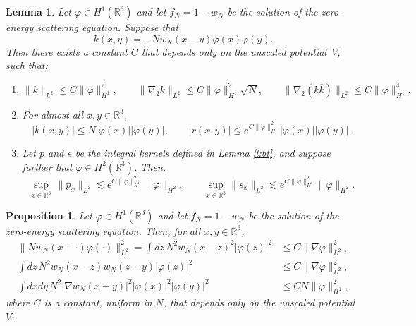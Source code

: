 \documentclass[11pt,a4paper,DIV11]{scrartcl}	%
\newtheorem{prp}[thm]{Proposition}
\newtheorem{lem}[thm]{Lemma}
\newcommand{\R}{\mathds{R}}
\newcommand{\norm}[1]{\lVert#1\rVert}	%
\begin{document}
\begin{lem} \label{l:kernels}
  Let $\varphi \in H^1(\R^3)$ and let $f_N=1-w_N$ be the solution of the
  zero-energy scattering equation. Suppose that
  \[
    k(x,y) = - N w_N(x-y) \varphi(x) \varphi(y).
  \]
  Then there exists a constant $C$%
 that depends only on the unscaled potential~$V$, such that: 
  \begin{enumerate}
    \item \label{k}
      $        \| k \|_{L^2} \le C \| \varphi \|_{H^1}^2, \qquad \| \nabla_2 k
        \|_{L^2} \le C \| \varphi \|_{H^1}^2 \sqrt{N}, \qquad \| \nabla_2 (k
        \overline{k}) \|_{L^2} \le C \| \varphi \|_{H^1}^4.      $
    \item \label{kr} For almost all $x,y \in \R^3$,
      \[
        |k(x,y)| \leq N |\varphi(x)| |\varphi(y)|, \qquad |r(x,y)| \le e^{C \|
        \varphi \|_{H^1}^2} |\varphi(x)| |\varphi(y)|.
      \] 
    \item \label{sup} Let $p$ and $s$ be the integral kernels defined in Lemma
      \ref{l:bt}, and suppose further that $\varphi \in H^2(\R^3)$. Then,
      \[
        \sup_{x \in \R^3} \, \norm{p_x}_{L^2} \apprle e^{C \| \varphi
        \|_{H^1}^2} \norm{\varphi}_{H^2}, \qquad \sup_{x \in \R^3}
        \norm{s_x}_{L^2} \apprle e^{C \| \varphi \|_{H^1}^2}
        \norm{\varphi}_{H^2}.
      \]
  \end{enumerate}
\end{lem}


\begin{prp} \label{p:wphi}
  Let $\varphi \in H^1(\R^3)$ and let $f_N=1-w_N$ be the solution of the
  zero-energy scattering equation. Then, for all $x,y \in \R^3$,
  \begin{align*}
    \norm{N w_N(x-\cdot)\varphi(\cdot)}_{L^2}^2 = \int dz \, N^2 w_N(x-z)^2 |\varphi(z)|^2 & \le C \| \nabla \varphi
    \|_{L^2}^2, \\
\int dz \, N^2 w_N(x-z) w_N(z-y) |\varphi(z)|^2 & \le C \| \nabla \varphi
    \|_{L^2}^2, \\
    \int dx dy \, N^2 |\nabla w_N(x-y)|^2 |\varphi(x)|^2 |\varphi(y)|^2 & \le
    C N \| \varphi \|_{H^1}^2,
  \end{align*}
  where $C$ is a constant, uniform in $N$, that depends only on the unscaled
  potential $V$.
\end{prp}
\end{document}

